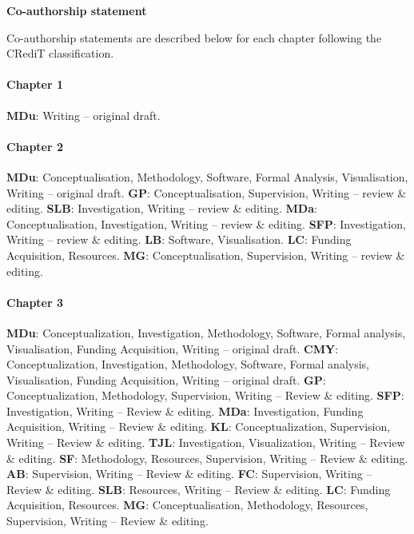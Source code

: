 \begin{center}
\textbf{\large Co-authorship statement}
\end{center}


Co-authorship statements are described below for each chapter following the CRediT classification.

\paragraph{Chapter 1}
\textbf{MDu}: Writing – original draft.

\paragraph{Chapter 2}
\textbf{MDu}: Conceptualisation, Methodology, Software, Formal Analysis, Visualisation, Writing – original draft. \textbf{GP}: Conceptualisation, Supervision, Writing – review \& editing. \textbf{SLB}: Investigation, Writing – review \& editing. \textbf{MDa}: Conceptualisation, Investigation, Writing – review \& editing. \textbf{SFP}: Investigation, Writing – review \& editing. \textbf{LB}: Software, Visualisation. \textbf{LC}: Funding Acquisition, Resources. \textbf{MG}: Conceptualisation, Supervision, Writing – review \& editing.

\paragraph{Chapter 3}
\textbf{MDu}: Conceptualization, Investigation, Methodology, Software, Formal analysis, Visualisation, Funding Acquisition, Writing – original draft.
\textbf{CMY}: Conceptualization, Investigation, Methodology, Software, Formal analysis, Visualisation, Funding Acquisition, Writing – original draft. \textbf{GP}: Conceptualization, Methodology, Supervision, Writing – Review \& editing. \textbf{SFP}: Investigation, Writing – Review \& editing. \textbf{MDa}: Investigation, Funding Acquisition, Writing – Review \& editing. \textbf{KL}: Conceptualization, Supervision, Writing – Review \& editing. \textbf{TJL}: Investigation, Visualization, Writing – Review \& editing. \textbf{SF}: Methodology, Resources, Supervision, Writing – Review \& editing. \textbf{AB}: Supervision, Writing – Review \& editing. \textbf{FC}: Supervision, Writing – Review \& editing. \textbf{SLB}: Resources, Writing – Review \& editing. \textbf{LC}: Funding Acquisition, Resources. \textbf{MG}: Conceptualisation, Methodology, Resources, Supervision, Writing – Review \& editing.

